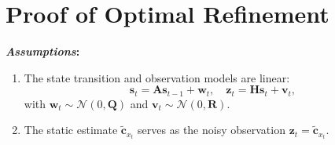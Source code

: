 \documentclass[journal,twoside,web]{ieeecolor}
\begin{document}
\section{Proof of Optimal Refinement}
\small
\textbf{\textit{Assumptions}:} 
\begin{enumerate}
    \item 
     The state transition and observation models are linear:  
	\begin{equation}  
	\mathbf{s}_t = \mathbf{A} \mathbf{s}_{t-1} + \mathbf{w}_t, \quad \mathbf{z}_t = \mathbf{H} \mathbf{s}_t + \mathbf{v}_t,   
	\end{equation}   
	with \(\mathbf{w}_t \sim \mathcal{N}(0, \mathbf{Q})\) and \(\mathbf{v}_t \sim \mathcal{N}(0, \mathbf{R})\).  
    \item 
    The static estimate \(\mathbf{\tilde c}_{x_t}\) serves as the noisy observation \(\mathbf{z}_t = \mathbf{\tilde c}_{x_t}\).  
\end{enumerate}
\end{document}
